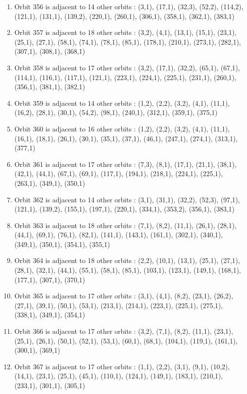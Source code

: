 \documentclass[12pt]{article}
\begin{document}
\begin{enumerate}
\item Orbit 356 is adjacent to 14 other orbits : (3,1), (17,1), (32,3), (52,2), (114,2), (121,1), (131,1), (139,2), (220,1), (260,1), (306,1), (358,1), (362,1), (383,1)
\item Orbit 357 is adjacent to 18 other orbits : (3,2), (4,1), (13,1), (15,1), (23,1), (25,1), (27,1), (58,1), (74,1), (78,1), (85,1), (178,1), (210,1), (273,1), (282,1), (307,1), (308,1), (368,1)
\item Orbit 358 is adjacent to 17 other orbits : (3,2), (17,1), (32,2), (65,1), (67,1), (114,1), (116,1), (117,1), (121,1), (223,1), (224,1), (225,1), (231,1), (260,1), (356,1), (381,1), (382,1)
\item Orbit 359 is adjacent to 14 other orbits : (1,2), (2,2), (3,2), (4,1), (11,1), (16,2), (28,1), (30,1), (54,2), (98,1), (240,1), (312,1), (359,1), (375,1)
\item Orbit 360 is adjacent to 16 other orbits : (1,2), (2,2), (3,2), (4,1), (11,1), (16,1), (18,1), (26,1), (30,1), (35,1), (37,1), (46,1), (247,1), (274,1), (313,1), (377,1)
\item Orbit 361 is adjacent to 17 other orbits : (7,3), (8,1), (17,1), (21,1), (38,1), (42,1), (44,1), (67,1), (69,1), (117,1), (194,1), (218,1), (224,1), (225,1), (263,1), (349,1), (350,1)
\item Orbit 362 is adjacent to 14 other orbits : (3,1), (31,1), (32,2), (52,3), (97,1), (121,1), (139,2), (155,1), (197,1), (220,1), (334,1), (353,2), (356,1), (383,1)
\item Orbit 363 is adjacent to 18 other orbits : (7,1), (8,2), (11,1), (26,1), (28,1), (44,1), (69,1), (76,1), (82,1), (141,1), (143,1), (161,1), (302,1), (340,1), (349,1), (350,1), (354,1), (355,1)
\item Orbit 364 is adjacent to 18 other orbits : (2,2), (10,1), (13,1), (25,1), (27,1), (28,1), (32,1), (44,1), (55,1), (58,1), (85,1), (103,1), (123,1), (149,1), (168,1), (177,1), (307,1), (370,1)
\item Orbit 365 is adjacent to 17 other orbits : (3,1), (4,1), (8,2), (23,1), (26,2), (27,1), (39,1), (50,1), (53,1), (213,1), (214,1), (223,1), (225,1), (275,1), (338,1), (349,1), (354,1)
\item Orbit 366 is adjacent to 17 other orbits : (3,2), (7,1), (8,2), (11,1), (23,1), (25,1), (26,1), (50,1), (52,1), (53,1), (60,1), (68,1), (104,1), (119,1), (161,1), (300,1), (369,1)
\item Orbit 367 is adjacent to 17 other orbits : (1,1), (2,2), (3,1), (9,1), (10,2), (14,1), (23,1), (25,1), (45,1), (110,1), (124,1), (149,1), (183,1), (210,1), (233,1), (301,1), (305,1)

\end{enumerate}
\end{document}

